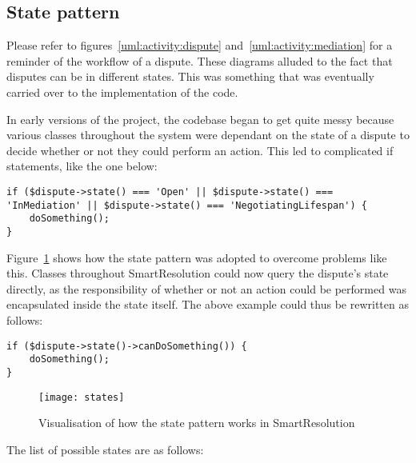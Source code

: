 \subsection{State pattern}

Please refer to figures~\ref{uml:activity:dispute} and~\ref{uml:activity:mediation} for a reminder of the workflow of a dispute. These diagrams alluded to the fact that disputes can be in different states. This was something that was eventually carried over to the implementation of the code.

In early versions of the project, the codebase began to get quite messy because various classes throughout the system were dependant on the state of a dispute to decide whether or not they could perform an action. This led to complicated if statements, like the one below:

\begin{lstlisting}
if ($dispute->state() === 'Open' || $dispute->state() === 'InMediation' || $dispute->state() === 'NegotiatingLifespan') {
    doSomething();
}
\end{lstlisting}

Figure~\ref{uml:states} shows how the state pattern was adopted to overcome problems like this. Classes throughout SmartResolution could now query the dispute's state directly, as the responsibility of whether or not an action could be performed was encapsulated inside the state itself. The above example could thus be rewritten as follows:

\begin{lstlisting}
if ($dispute->state()->canDoSomething()) {
    doSomething();
}
\end{lstlisting}

\begin{figure}[h!]
  \centering
    \ifimages
    \texttt{[image: states]}
    \fi
  \caption{Visualisation of how the state pattern works in SmartResolution}
  \label{uml:states}
\end{figure}

The list of possible states are as follows:

